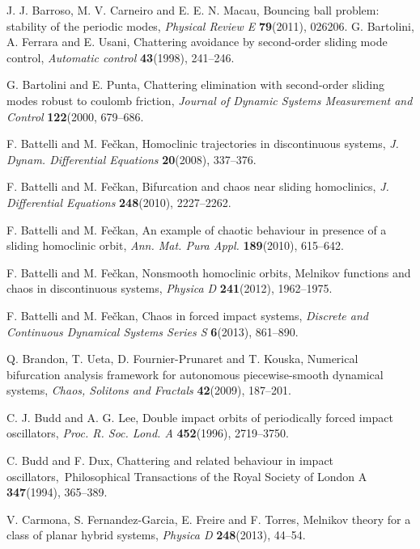 \documentclass[12pt,openany,CJK,oneside]{cctbook}
\begin{document}
{{\begin{thebibliography}{999}
 J. J. Barroso, M. V. Carneiro and E. E. N. Macau, Bouncing ball problem: stability of the periodic modes, {\it Physical Review E}
{\bf 79}(2011), 026206.
G. Bartolini, A. Ferrara and E. Usani, Chattering avoidance by second-order sliding mode control, {\it Automatic control} {\bf 43}(1998), 241--246.


G. Bartolini and E. Punta, Chattering elimination with second-order sliding modes robust to coulomb friction, {\it Journal of Dynamic Systems Measurement and Control} {\bf 122}(2000, 679--686.


 F. Battelli and M. Fe\v{c}kan,
Homoclinic trajectories in discontinuous systems,
{\it J. Dynam. Differential Equations} {\bf 20}(2008), 337--376.

 F. Battelli and M. Fe\v{c}kan,
Bifurcation and chaos near sliding homoclinics,
{\it J. Differential Equations}  {\bf 248}(2010), 2227--2262.

 F. Battelli and M. Fe\v{c}kan,
An example of chaotic behaviour in presence of a sliding homoclinic orbit,
{\it Ann. Mat. Pura Appl.} {\bf 189}(2010), 615--642.

 F. Battelli and M. Fe\v{c}kan,
Nonsmooth homoclinic orbits, Melnikov functions and chaos in discontinuous systems,
{\it Physica D} {\bf 241}(2012), 1962--1975.

 F. Battelli and M. Fe\v{c}kan, Chaos in forced impact systems,
{\it Discrete and Continuous Dynamical Systems Series S } {\bf 6}(2013), 861--890.



Q. Brandon, T. Ueta, D. Fournier-Prunaret and T. Kouska,
Numerical bifurcation analysis framework for autonomous piecewise-smooth dynamical systems, {\it Chaos, Solitons and Fractals} {\bf 42}(2009), 187--201.

 C. J. Budd and A. G. Lee, Double impact orbits of periodically forced impact oscillators, {\it Proc. R. Soc. Lond. A} {\bf 452}(1996), 2719--3750.


 C. Budd and F. Dux, Chattering and related behaviour in impact oscillators,{\ Philosophical Transactions of the Royal Society of London A} {\bf 347}(1994), 365--389.

 V. Carmona, S. Fernandez-Garcia, E. Freire and F. Torres, Melnikov theory
for a class of planar hybrid systems, {\it Physica D} {\bf 248}(2013), 44--54.


\end{thebibliography}}}
\end{document}
